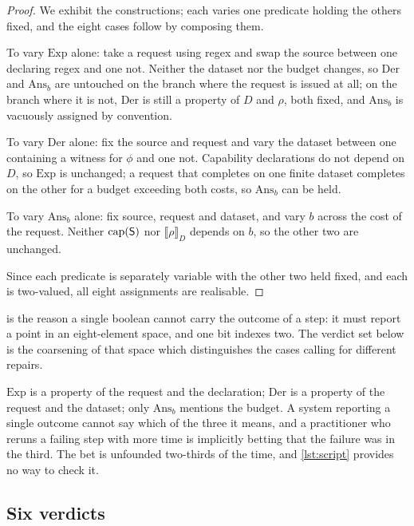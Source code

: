\begin{proof}
We exhibit the constructions; each varies one predicate holding the others
fixed, and the eight cases follow by composing them.

To vary $\mathrm{Exp}$ alone: take a request using \textsf{regex} and swap the
source between one declaring \textsf{regex} and one not. Neither the dataset
nor the budget changes, so $\mathrm{Der}$ and $\mathrm{Ans}_b$ are untouched on
the branch where the request is issued at all; on the branch where it is not,
$\mathrm{Der}$ is still a property of $D$ and $\rho$, both fixed, and
$\mathrm{Ans}_b$ is vacuously assigned by convention.

To vary $\mathrm{Der}$ alone: fix the source and request and vary the dataset
between one containing a witness for $\phi$ and one not. Capability
declarations do not depend on $D$, so $\mathrm{Exp}$ is unchanged; a request
that completes on one finite dataset completes on the other for a budget
exceeding both costs, so $\mathrm{Ans}_b$ can be held.

To vary $\mathrm{Ans}_b$ alone: fix source, request and dataset, and vary $b$
across the cost of the request. Neither $\mathrm{cap}(\mathsf{S})$ nor
$\llbracket\rho\rrbracket_D$ depends on $b$, so the other two are unchanged.

Since each predicate is separately variable with the other two held fixed, and
each is two-valued, all eight assignments are realisable.
\end{proof}

 is the reason a single boolean cannot carry the
outcome of a step: it must report a point in an eight-element space, and one
bit indexes two. The verdict set below is the coarsening of that space which
distinguishes the cases calling for different repairs.

\begin{remark}
\label{rem:clock}
$\mathrm{Exp}$ is a property of the request and the declaration;
$\mathrm{Der}$ is a property of the request and the dataset; only
$\mathrm{Ans}_b$ mentions the budget. A system reporting a single outcome
cannot say which of the three it means, and a practitioner who reruns a failing
step with more time is implicitly betting that the failure was in the third.
The bet is unfounded two-thirds of the time, and \cref{lst:script} provides no
way to check it.
\end{remark}

\subsection{Six verdicts}


